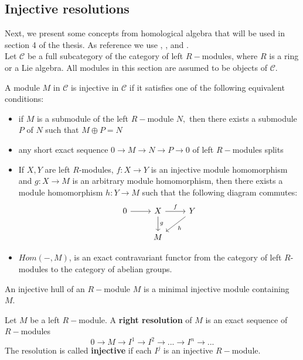 \documentclass[main.tex]{subfiles}
\begin{document}
\subsection{Injective resolutions}
Next, we present some concepts from homological algebra that will be used in section 4 of the thesis. As reference we use \cite{weibel1994introduction}, \cite{phamthesis}, and \cite{wikipediainjectivemodule}. \\

Let $\mathcal{C}$ be a full subcategory of the category of left $R-$modules, where $R$ is a ring or a Lie algebra. All modules in this section are assumed to be objects of $\mathcal{C}.$
\begin{defn}
A module $M$ in $\mathcal{C}$ is injective in $\mathcal{C}$ if it satisfies one of the following equivalent conditions:
\begin{itemize}
    \item if $M$ is a submodule of the left $R-$module $N,$ then there exists a submodule $P$ of $N$ such that $M\oplus P=N$
    \item any short exact sequence 
    $0\to M \to N \to P \to 0$
    of left $R-$modules splits
    \item If $X, Y$ are left $R$-modules, $f: X\to Y$ is an injective module homomorphism and $g:X\to M$ is an arbitrary module homomorphism, then there exists a module homomorphism $h:Y\to M$ such that the following diagram commutes:
    $$
        \begin{tikzcd}
            0 \arrow{r}{}
            & X \arrow{r}{f} \arrow{d}{g}
            & Y \arrow{ld}{h}
            \\
            & M  
        \end{tikzcd}
    $$
    \item $Hom(-, M)$, is an exact contravariant functor from the category of left $R$-modules to the category of abelian groups.
\end{itemize}
\end{defn}
\bigskip
\begin{defn}
    An injective hull of an $R-$module $M$ is a minimal injective module containing $M.$
\end{defn}
\bigskip
\begin{defn}
    Let $M$ be a left $R-$module. A \textbf{right resolution} of $M$ is an exact sequence of $R-$modules
    $$0\to M \to I^1\to I^2 \to ... \to I^n \to ...$$
    The resolution is called \textbf{injective} if each $I^j$ is an injective $R-$module.
\end{defn}
\end{document}
